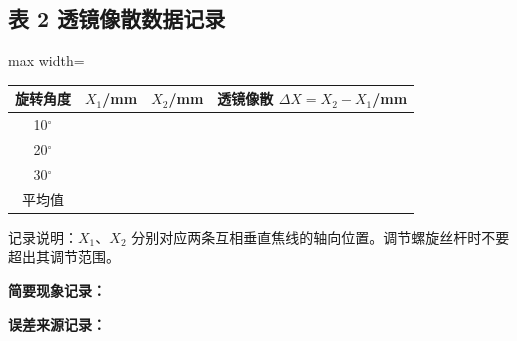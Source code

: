 \documentclass[12pt, a4paper]{article}
\begin{document}
\subsection*{表 2 \quad 透镜像散数据记录}
\begin{table}[H]
  \centering
  \begin{adjustbox}{max width=\textwidth}
    \begin{tabular}{cccc}
      \toprule
      旋转角度 & $X_1$/mm & $X_2$/mm & 透镜像散 $\Delta X=X_2-X_1$/mm \\
      \midrule
      10$^\circ$ & & & \\
      20$^\circ$ & & & \\
      30$^\circ$ & & & \\
      \midrule
      平均值 & & & \\
      \bottomrule
    \end{tabular}
  \end{adjustbox}
\end{table}
{\footnotesize 记录说明：$X_1$、$X_2$ 分别对应两条互相垂直焦线的轴向位置。调节螺旋丝杆时不要超出其调节范围。}

\vspace{1cm}
\noindent\textbf{简要现象记录：}

\vspace{2cm}

\noindent\textbf{误差来源记录：}

\vspace{2cm}
\end{document}
